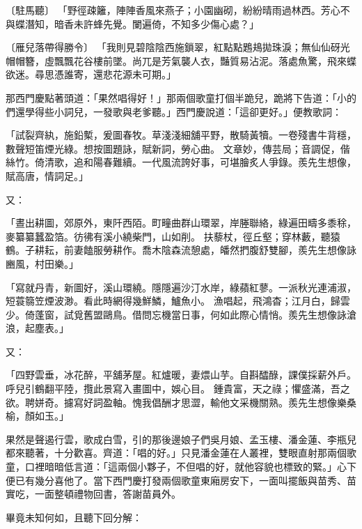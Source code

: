 \begin{showcontents}{}
〔駐馬聽〕  「野徑疎籬，陣陣香風來燕子；小園幽砌，紛紛晴雨過林西。芳心不與蝶潛知，暗香未許蜂先覺。闌遍倚，不知多少傷心處？」

〔雁兒落帶得勝令〕  「我則見碧陰陰西施鎖翠，紅點點鶗鳺拋珠淚；無仙仙砑光帽帽簪，虛飄飄花谷樓前墜。尚兀是芳氣襲人衣，豔質易沾泥。落處魚驚，飛來蝶欲迷。尋思憑誰寄，還悲花源未可期。」

那西門慶點著頭道：「果然唱得好！」那兩個歌童打個半跪兒，跪將下告道：「小的們還學得些小詞兒，一發歌與老爹聽。」西門慶說道：「這卻更好。」便教歌詞：

「試裂齊紈，施鉛槧，爰圖春牧。草淺淺細舖平野，散騎黃犢。一卷殘書牛背穩，數聲短笛煙光綠。想按圖題詠，賦新詞，勞心曲。  文章妙，傳芸局；音調促，偕絲竹。倚清歌，追和陽春難續。一代風流誇好事，可堪膾炙人爭錄。羨先生想像，賦高唐，情詞足。」

又：

「晝出耕圖，郊原外，東阡西陌。町疃曲群山環翠，岸塍聯絡，綠遍田疇多黍稌，麥纂纂蠶盈箔。彷彿有溪小繞柴門，山如削。  扶藜杖，徑丘壑；穿林藪，聽猿鶴。子耕耘，前妻饁服勞耕作。喬木陰森流憩處，皤然捫腹舒雙腳，羨先生想像詠豳風，村田樂。」

「寫就丹青，新圖好，溪山環繞。隱隱遍沙汀水岸，綠蘋紅蓼。一派秋光連浦淑，短蓑篛笠煙波渺。看此時網得幾鮮鱗，鱸魚小。  漁唱起，飛鴻杳；江月白，歸雲少。倚蓬窗，試覓舊盟鷗鳥。借問忘機當日事，何如此際心情悄。羨先生想像詠滄浪，起塵表。」

又：

「四野雲垂，冰花醉，平舖茅屋。紅爐暖，妻煨山芋。自斟醽醁，課僕採薪外戶。呼兒引鶴翻平陸，攬此景寫入畫圖中，娛心目。  鍾貴富，天之祿；懼盛滿，吾之欲。聘姘奇。攄寫好詞盈軸。愧我倡酬才思澀，輸他文采機關熟。羨先生想像樂桑榆，顏如玉。」

果然是聲遏行雲，歌成白雪，引的那後邊娘子們吳月娘、孟玉樓、潘金蓮、李瓶兒都來聽著，十分歡喜。齊道：「唱的好。」只見潘金蓮在人叢裡，雙眼直射那兩個歌童，口裡暗暗低言道：「這兩個小夥子，不但唱的好，就他容貌也標致的緊。」心下便已有幾分喜他了。當下西門慶打發兩個歌童東廂房安下，一面叫擺飯與苗秀、苗實吃，一面整頓禮物回書，答謝苗員外。

畢竟未知何如，且聽下回分解：




\end{showcontents}


